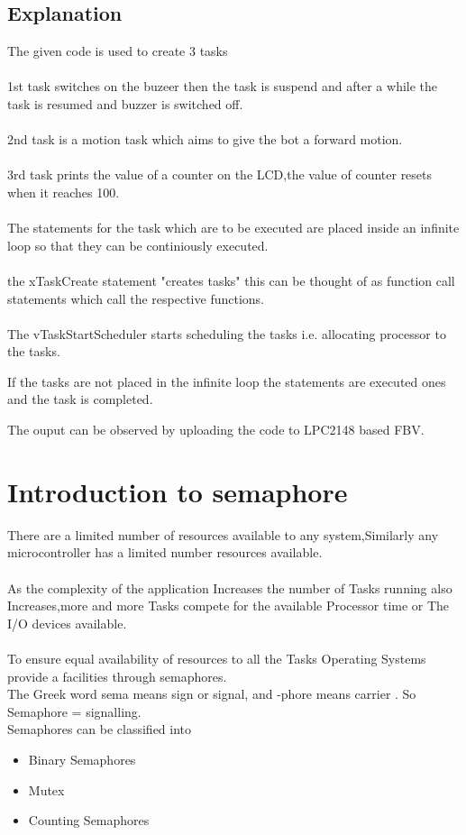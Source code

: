 \documentclass[11pt,a4paper]{article}
\begin{document}
	\subsection{Explanation}
	The given code is used to create 3 tasks 
	\\
	\\
	1st task switches on the buzeer then the task is suspend and after a while the task is resumed and buzzer is switched off.
	\\
	\\
	2nd task is a motion task which aims to give the bot a forward motion.
	\\
	\\
	3rd task prints the value of a counter on the LCD,the value of counter resets when it reaches 100.
	\\
	\\
	The statements for the task which are to be executed are placed inside an infinite loop so that they can be continiously executed.
	\\
	\\
	the xTaskCreate statement "creates tasks" this can be thought of as function call statements which call the respective functions.
	\\ 
	\\
	The vTaskStartScheduler starts scheduling the tasks i.e. allocating processor to the tasks.
	
	If the tasks are not placed in the infinite loop the statements are executed ones and the task is completed.
	
	The ouput can be observed by uploading the code to LPC2148 based FBV.
	  
	  \newpage
	\section{Introduction to semaphore}
	There are a limited number of resources available to any system,Similarly any microcontroller has a limited number  resources available.
	\\ \\
	As the complexity of the application Increases the number of Tasks running also Increases,more and more Tasks compete for the available Processor time or The I/O devices available.
	\\ \\
	To ensure equal availability of resources to all the Tasks Operating Systems provide a facilities through semaphores.
	\\ 
	The Greek word sema means sign or signal, and -phore means carrier . So Semaphore = signalling.
	\\
	Semaphores can be classified into
	\\ 
	\begin{itemize}
	\item Binary Semaphores
	\item Mutex	 
	\item Counting Semaphores
	
	
	\end{itemize}
\end{document}
